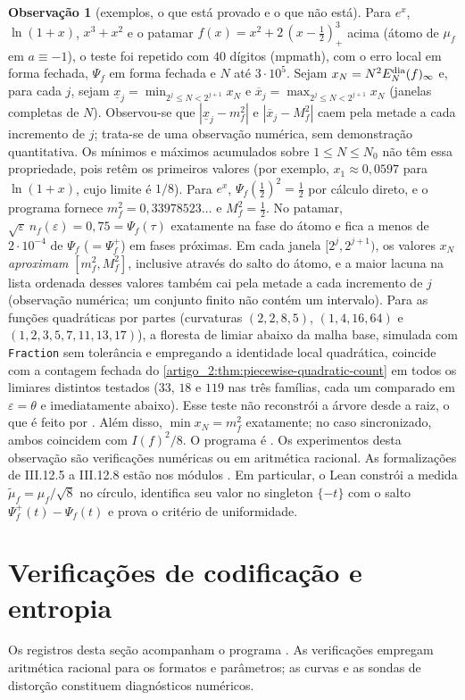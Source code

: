 \documentclass[12pt,a4paper]{article}
\theoremstyle{preciso}
\theoremstyle{definition}
\theoremstyle{preciso}
\theoremstyle{preciso}
\theoremstyle{preciso}
\theoremstyle{preciso}
\theoremstyle{definition}
\theoremstyle{preciso}
\theoremstyle{definition}
\newtheorem{remark}[teorema]{Observação}
\theoremstyle{preciso}
\theoremstyle{preciso}
\theoremstyle{definition}
\begin{document}
\begin{remark}[exemplos, o que está provado e o que não está]
Para $e^x$, $\ln(1+x)$, $x^3+x^2$ e o patamar $f(x)=x^2+2\,(x-\tfrac12)_+^3$
acima (átomo de $\mu_f$ em $a\equiv-1$), o teste foi repetido com $40$ dígitos
(mpmath), com o erro local em forma fechada, $\Psi_f$ em forma fechada e
$N$ até $3\cdot10^5$. Sejam $x_N=N^2E_N^{\rm dia}(f)_\infty$ e, para cada $j$, sejam
$\underline x_j=\min_{2^j\le N<2^{j+1}}x_N$ e $\overline x_j=\max_{2^j\le N<2^{j+1}}x_N$
(janelas completas de $N$). Observou-se que $|\underline x_j-m_f^2|$ e $|\overline x_j-M_f^2|$
caem pela metade a cada incremento de $j$; trata-se de uma observação numérica, sem
demonstração quantitativa. Os mínimos e máximos acumulados sobre $1\le N\le N_0$
não têm essa propriedade, pois retêm os primeiros valores (por exemplo,
$x_1\approx0{,}0597$ para $\ln(1+x)$, cujo limite é $1/8$). Para $e^x$, $\Psi_f(\tfrac12)^2=\tfrac12$ por
cálculo direto, e o programa fornece $m_f^2=0{,}33978523\ldots$ e $M_f^2=\tfrac12$.
No patamar, $\sqrt\varepsilon\,n_f(\varepsilon)=0{,}75=\Psi_f(\tau)$ exatamente na
fase do átomo e fica a menos de $2\cdot10^{-4}$ de $\Psi_f$ ($=\Psi_f^+$) em fases próximas.
Em cada janela $[2^j,2^{j+1})$, os valores $x_N$ \emph{aproximam}
$[m_f^2,M_f^2]$, inclusive através do salto do átomo, e a maior lacuna na lista
ordenada desses valores também cai pela metade a cada incremento de $j$
(observação numérica; um conjunto finito não contém um intervalo).
Para as funções quadráticas por partes (curvaturas
$(2,2,8,5)$, $(1,4,16,64)$ e $(1,2,3,5,7,11,13,17)$), a floresta de limiar
abaixo da malha base, simulada com \texttt{Fraction} sem tolerância e empregando a
identidade local quadrática, coincide com a contagem fechada do
\cref{artigo_2:thm:piecewise-quadratic-count} em todos os limiares distintos
testados ($33$, $18$ e $119$ nas três famílias, cada um comparado em $\varepsilon=\theta$
e imediatamente abaixo). Esse teste não reconstrói a árvore desde a raiz, o que
é feito por . Além disso,
$\min x_N=m_f^2$ exatamente; no caso sincronizado, ambos coincidem com
$I(f)^2/8$. O programa é . Os
experimentos desta observação são verificações numéricas ou em aritmética
racional. As formalizações de III.12.5 a III.12.8 estão nos módulos
. Em particular, o Lean
constrói a medida $\tilde\mu_f=\mu_f/\sqrt8$ no círculo, identifica seu valor no
singleton $\{-t\}$ com o salto $\Psi_f^+(t)-\Psi_f(t)$ e prova o critério
de uniformidade.
\end{remark}

\section{Verificações de codificação e entropia}
\label{artigo_2:sec:coding-validation}
Os registros desta seção acompanham o programa . As verificações empregam aritmética racional para os formatos e parâmetros; as curvas e as sondas de distorção constituem diagnósticos numéricos.
\end{document}
